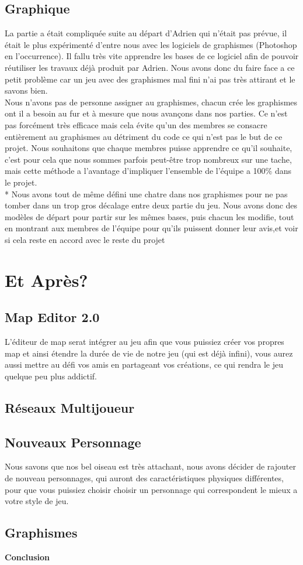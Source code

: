 \documentclass [11pt]{report}
\begin{document}
	\section{Graphique}
	La partie a était compliquée suite au départ d'Adrien qui n'était pas prévue, il était le plus expérimenté d'entre nous avec les logiciels de graphismes (Photoshop en l'occurrence). Il fallu très vite apprendre les bases de ce logiciel afin de pouvoir réutiliser les travaux déjà produit par Adrien. Nous avons donc du faire face a ce petit problème car un jeu avec des graphismes mal fini n'ai pas très attirant et le savons bien.\\
	\indent Nous n'avons pas de personne assigner au graphismes, chacun crée les graphismes ont il a besoin au fur et à mesure que nous avançons dans nos parties. Ce n'est pas forcément très efficace mais cela évite qu'un des membres se consacre entièrement au graphismes au détriment du code ce qui n'est pas le but de ce projet. Nous souhaitons que chaque membres puisse apprendre ce qu'il souhaite, c'est pour cela que nous sommes parfois peut-être trop nombreux sur une tache, mais cette méthode a l'avantage d'impliquer l'ensemble de l'équipe a 100\% dans le projet.\\*
	\indent Nous avons tout de même défini une chatre dans nos graphismes pour ne pas tomber dans un trop gros décalage entre deux partie du jeu. Nous avons donc des modèles de départ pour partir sur les mêmes bases, puis chacun les modifie, tout en montrant aux membres de l'équipe pour qu'ils puissent donner leur avis,et voir si cela reste en accord avec le reste du projet
\chapter{Et Après?}
	\section{Map Editor 2.0}
	L'éditeur de map serat intégrer au jeu afin que vous puissiez créer vos propres map et ainsi étendre la durée de vie de notre jeu (qui est déjà infini), vous aurez aussi mettre au défi vos amis en partageant vos créations, ce qui rendra le jeu quelque peu plus addictif.
	\section{Réseaux Multijoueur}

	\section{Nouveaux Personnage}
	Nous savons que nos bel oiseau est très attachant, nous avons décider de rajouter de nouveau personnages, qui auront des caractéristiques physiques différentes, pour que vous puissiez choisir choisir un personnage qui correspondent le mieux a votre style de jeu.
	\section{Graphismes}
\newpage
\textbf{{\huge Conclusion}}
\end{document}
